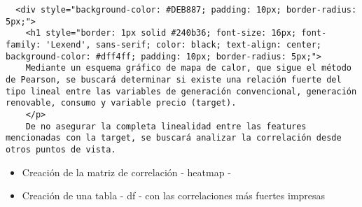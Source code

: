 \documentclass[11pt]{article}
\providecommand{\tightlist}{%
      \setlength{\itemsep}{0pt}\setlength{\parskip}{0pt}}
\begin{document}
    \begin{verbatim}
  <div style="background-color: #DEB887; padding: 10px; border-radius: 5px;">
    <h1 style="border: 1px solid #240b36; font-size: 16px; font-family: 'Lexend', sans-serif; color: black; text-align: center; background-color: #dff4ff; padding: 10px; border-radius: 5px;">
    Mediante un esquema gráfico de mapa de calor, que sigue el método de Pearson, se buscará determinar si existe una relación fuerte del tipo lineal entre las variables de generación convencional, generación renovable, consumo y variable precio (target).
    </p>
    De no asegurar la completa linealidad entre las features mencionadas con la target, se buscará analizar la correlación desde otros puntos de vista.
\end{verbatim}

    \begin{itemize}
\tightlist
\item
  Creación de la matriz de correlación - heatmap -
\item
  Creación de una tabla - df - con las correlaciones más fuertes
  impresas
\end{itemize}
\end{document}
